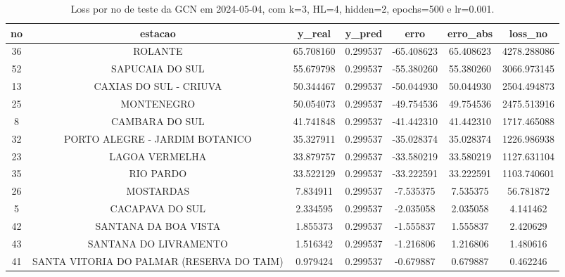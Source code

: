 \begin{table}[h]
\centering
\caption{Loss por no de teste da GCN em 2024-05-04, com k=3, HL=4, hidden=2, epochs=500 e lr=0.001.}
\label{tab:gcn_loss_k3_hl4_h2_e500_d20240504}
\begin{tabular}{ccccccc}
\toprule
no & estacao & y\_real & y\_pred & erro & erro\_abs & loss\_no \\
\midrule
36 & ROLANTE & 65.708160 & 0.299537 & -65.408623 & 65.408623 & 4278.288086 \\
52 & SAPUCAIA DO SUL & 55.679798 & 0.299537 & -55.380260 & 55.380260 & 3066.973145 \\
13 & CAXIAS DO SUL - CRIUVA & 50.344467 & 0.299537 & -50.044930 & 50.044930 & 2504.494873 \\
25 & MONTENEGRO & 50.054073 & 0.299537 & -49.754536 & 49.754536 & 2475.513916 \\
8 & CAMBARA DO SUL & 41.741848 & 0.299537 & -41.442310 & 41.442310 & 1717.465088 \\
32 & PORTO ALEGRE - JARDIM BOTANICO & 35.327911 & 0.299537 & -35.028374 & 35.028374 & 1226.986938 \\
23 & LAGOA VERMELHA & 33.879757 & 0.299537 & -33.580219 & 33.580219 & 1127.631104 \\
35 & RIO PARDO & 33.522129 & 0.299537 & -33.222591 & 33.222591 & 1103.740601 \\
26 & MOSTARDAS & 7.834911 & 0.299537 & -7.535375 & 7.535375 & 56.781872 \\
5 & CACAPAVA DO SUL & 2.334595 & 0.299537 & -2.035058 & 2.035058 & 4.141462 \\
42 & SANTANA DA BOA VISTA & 1.855373 & 0.299537 & -1.555837 & 1.555837 & 2.420629 \\
43 & SANTANA DO LIVRAMENTO & 1.516342 & 0.299537 & -1.216806 & 1.216806 & 1.480616 \\
41 & SANTA VITORIA DO PALMAR (RESERVA DO TAIM) & 0.979424 & 0.299537 & -0.679887 & 0.679887 & 0.462246 \\
\bottomrule
\end{tabular}
\end{table}
